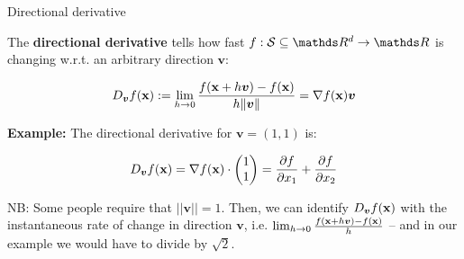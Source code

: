 \documentclass[11pt,compress,t,notes=noshow, xcolor=table]{beamer}
\begin{document}
\begin{vbframe}{Directional derivative}

The \textbf{directional derivative} tells how fast $f: \mathcal{S}\subseteq \R^d \to \R$ is changing w.r.t. an arbitrary direction $\bm{v}$:

 $$
   D_{\bm{v}} f(\mathbf{x}) := \lim_{h \to 0} \frac{f(\mathbf{x} + h \bm v) - f(\mathbf{x})}{h \|\bm v\|} = \nabla f(\mathbf{x}) \bm v
 $$


\textbf{Example: } The directional derivative for $\bm{v} = (1, 1)$ is:

$$
D_{\bm{v}} f(\mathbf{x}) = \nabla f(\mathbf{x}) \cdot \begin{pmatrix} 1 \\1\end{pmatrix} = \frac{\partial f}{\partial x_1} + \frac{\partial f}{\partial x_2}
$$

NB: Some people require that $||\bm{v}|| = 1$. Then, we can identify $D_{\bm{v}} f(\mathbf{x})$ with the instantaneous rate of change in direction $\bm{v}$, i.e. $\lim_{h \to 0} \frac{f(\mathbf{x} + h \bm v) - f(\mathbf{x})}{h}$ -- and in our example we would have to divide by $\sqrt{2}$.

\end{vbframe}
\end{document}
